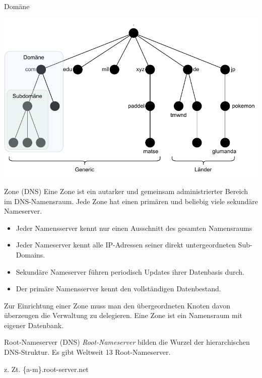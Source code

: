 \begin{example}{Domäne}
    \begin{center}
        \includegraphics[width=\textwidth]{includes/figures/example_domains.pdf}
    \end{center}
\end{example}

\begin{defi}{Zone (DNS)}
    Eine Zone ist ein autarker und gemeinsam administrierter Bereich im DNS-Namensraum.
    Jede Zone hat einen primären und beliebig viele sekundäre Nameserver.

    \begin{itemize}
        \item Jeder Namensserver kennt nur einen Ausschnitt des gesamten Namensraums
        \item Jeder Nameserver kennt alle IP-Adressen seiner direkt untergeordneten Sub-Domains.
        \item Sekundäre Nameserver führen periodisch Updates ihrer Datenbasis durch.
        \item Der primäre Namensserver kennt den vollständigen Datenbestand.
    \end{itemize}

    Zur Einrichtung einer Zone muss man den übergeordneten Knoten davon überzeugen die Verwaltung zu delegieren.
    Eine Zone ist ein Namensraum mit eigener Datenbank.
\end{defi}

\begin{defi}{Root-Nameserver (DNS)}
    \emph{Root-Nameserver} bilden die Wurzel der hierarchischen DNS-Struktur.
    Es gibt Weltweit 13 Root-Nameserver.

    z. Zt. \{a-m\}.root-server.net
\end{defi}

